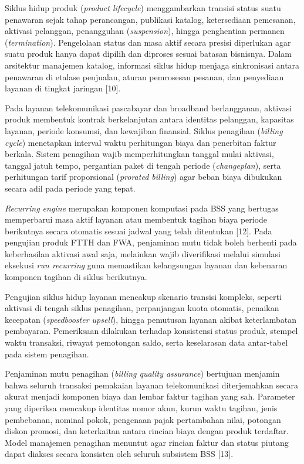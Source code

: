 \documentclass[12pt,a4paper]{article}
\begin{document}
\vspace{0.25cm}
Siklus hidup produk (\textit{product lifecycle}) menggambarkan transisi status suatu penawaran sejak tahap perancangan, publikasi katalog, ketersediaan pemesanan, aktivasi pelanggan, penangguhan (\textit{suspension}), hingga penghentian permanen (\textit{termination}). Pengelolaan status dan masa aktif secara presisi diperlukan agar suatu produk hanya dapat dipilih dan diproses sesuai batasan bisnisnya. Dalam arsitektur manajemen katalog, informasi siklus hidup menjaga sinkronisasi antara penawaran di etalase penjualan, aturan pemrosesan pesanan, dan penyediaan layanan di tingkat jaringan [10].

Pada layanan telekomunikasi pascabayar dan broadband berlangganan, aktivasi produk membentuk kontrak berkelanjutan antara identitas pelanggan, kapasitas layanan, periode konsumsi, dan kewajiban finansial. Siklus penagihan (\textit{billing cycle}) menetapkan interval waktu perhitungan biaya dan penerbitan faktur berkala. Sistem penagihan wajib memperhitungkan tanggal mulai aktivasi, tanggal jatuh tempo, pergantian paket di tengah periode (\textit{changeplan}), serta perhitungan tarif proporsional (\textit{prorated billing}) agar beban biaya dibukukan secara adil pada periode yang tepat.

\textit{Recurring engine} merupakan komponen komputasi pada BSS yang bertugas memperbarui masa aktif layanan atau membentuk tagihan biaya periode berikutnya secara otomatis sesuai jadwal yang telah ditentukan [12]. Pada pengujian produk FTTH dan FWA, penjaminan mutu tidak boleh berhenti pada keberhasilan aktivasi awal saja, melainkan wajib diverifikasi melalui simulasi eksekusi \textit{run recurring} guna memastikan kelangsungan layanan dan kebenaran komponen tagihan di siklus berikutnya.

Pengujian siklus hidup layanan mencakup skenario transisi kompleks, seperti aktivasi di tengah siklus penagihan, perpanjangan kuota otomatis, penaikan kecepatan (\textit{speedbooster upsell}), hingga pemutusan layanan akibat keterlambatan pembayaran. Pemeriksaan dilakukan terhadap konsistensi status produk, stempel waktu transaksi, riwayat pemotongan saldo, serta keselarasan data antar-tabel pada sistem penagihan.

\vspace{0.25cm}
Penjaminan mutu penagihan (\textit{billing quality assurance}) bertujuan menjamin bahwa seluruh transaksi pemakaian layanan telekomunikasi diterjemahkan secara akurat menjadi komponen biaya dan lembar faktur tagihan yang sah. Parameter yang diperiksa mencakup identitas nomor akun, kurun waktu tagihan, jenis pembebanan, nominal pokok, pengenaan pajak pertambahan nilai, potongan diskon promosi, dan keterkaitan antara rincian biaya dengan produk terdaftar. Model manajemen penagihan menuntut agar rincian faktur dan status piutang dapat diakses secara konsisten oleh seluruh subsistem BSS [13].
\end{document}
